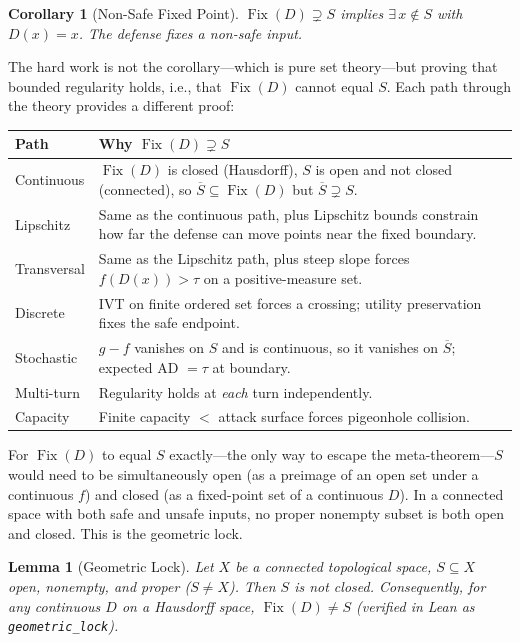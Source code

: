 \documentclass[11pt]{article}
\newtheorem{lemma}[theorem]{Lemma}
\newtheorem{corollary}[theorem]{Corollary}
\newcommand{\cl}[1]{\overline{#1}}
\newcommand{\Fix}{\operatorname{Fix}}
\begin{document}
\begin{corollary}[Non-Safe Fixed Point]
$\Fix(D) \supsetneq S$ implies $\exists\, x \notin S$ with
$D(x) = x$. The defense fixes a non-safe input.
\end{corollary}

The hard work is not the corollary---which is pure set theory---but
proving that bounded regularity holds, i.e., that $\Fix(D)$ cannot
equal $S$. Each path through the theory provides a different proof:

\begin{center}
\small
\begin{tabular}{@{}lp{8cm}@{}}
\toprule
\textbf{Path} & \textbf{Why $\Fix(D) \supsetneq S$} \\
\midrule
Continuous
  & $\Fix(D)$ is closed (Hausdorff), $S$ is open and not closed
    (connected), so $\cl{S} \subseteq \Fix(D)$ but
    $\cl{S} \supsetneq S$. \\[3pt]
Lipschitz
  & Same as the continuous path, plus Lipschitz bounds constrain how far
    the defense can move points near the fixed boundary. \\[3pt]
Transversal
  & Same as the Lipschitz path, plus steep slope forces
    $f(D(x)) > \tau$ on a positive-measure set. \\[3pt]
Discrete
  & IVT on finite ordered set forces a crossing; utility preservation
    fixes the safe endpoint. \\[3pt]
Stochastic
  & $g - f$ vanishes on $S$ and is continuous, so it vanishes on
    $\cl{S}$; expected AD $= \tau$ at boundary. \\[3pt]
Multi-turn
  & Regularity holds at \emph{each} turn independently. \\[3pt]
Capacity
  & Finite capacity $<$ attack surface forces pigeonhole collision. \\
\bottomrule
\end{tabular}
\end{center}

\noindent For $\Fix(D)$ to equal $S$ exactly---the only way to escape
the meta-theorem---$S$ would need to be simultaneously open (as a
preimage of an open set under a continuous $f$) and closed (as a
fixed-point set of a continuous $D$). In a connected space with both
safe and unsafe inputs, no proper nonempty subset is both open and
closed. This is the geometric lock.

\begin{lemma}[Geometric Lock]
\label{lem:lock}
Let $X$ be a connected topological space, $S \subseteq X$ open, nonempty, and proper ($S \neq X$). Then $S$ is not closed. Consequently, for any continuous $D$ on a Hausdorff space, $\Fix(D) \neq S$ (verified in Lean as \texttt{geometric\_lock}).
\end{lemma}
\end{document}
